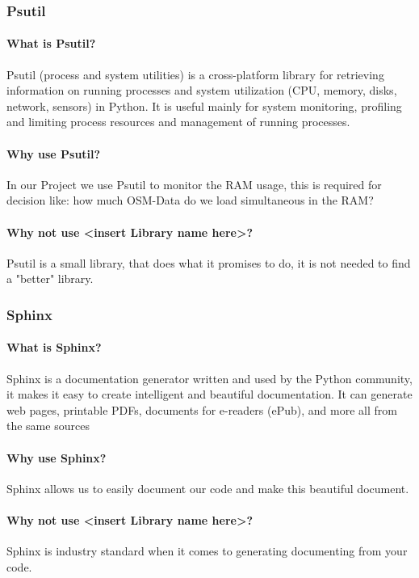 \documentclass[parskip=full]{scrartcl} %
\begin{document}
\subsubsection{Psutil}
\paragraph{What is Psutil?}
Psutil (process and system utilities) is a cross-platform library for retrieving information on running processes and system utilization (CPU, memory, disks, network, sensors) in Python. It is useful mainly for system monitoring, profiling and limiting process resources and management of running processes. 

\paragraph{Why use Psutil?}
In our Project we use Psutil to monitor the RAM usage, this is required for decision like: how much OSM-Data do we load simultaneous in the RAM?

\paragraph{Why not use <insert Library name here>?}
Psutil is a small  library, that does what it promises to do, it is not needed to find a "better" library.



\subsubsection{Sphinx}

\paragraph{What is Sphinx?}
Sphinx is a documentation generator written and used by the Python community, it makes it easy to create intelligent and beautiful documentation.
It can generate web pages, printable PDFs, documents for e-readers (ePub), and more all from the same sources

\paragraph{Why use Sphinx?}
Sphinx allows us to easily document our code and make this beautiful document.

\paragraph{Why not use <insert Library name here>?}
Sphinx is industry standard when it comes to generating documenting from your code.
\end{document}
